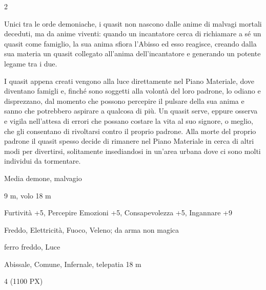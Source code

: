 \begin{multicols}{2}
{Unici tra le orde demoniache, i quasit non nascono dalle anime di malvagi mortali deceduti, ma da anime viventi: quando un incantatore cerca di richiamare a sé un quasit come famiglio, la sua anima sfiora l'Abisso ed esso reagisce, creando dalla sua materia un quasit collegato all'anima dell'incantatore e generando un potente legame tra i due.

I quasit appena creati vengono alla luce direttamente nel Piano Materiale, dove diventano famigli e, finché sono soggetti alla volontà del loro padrone, lo odiano e disprezzano, dal momento che possono percepire il pulsare della sua anima e sanno che potrebbero aspirare a qualcosa di più. Un quasit serve, eppure osserva e vigila nell'attesa di errori che possano costare la vita al suo signore, o meglio, che gli consentano di rivoltarsi contro il proprio padrone. Alla morte del proprio padrone il quasit spesso decide di rimanere nel Piano Materiale in cerca di altri modi per divertirsi, solitamente insediandosi in un'area urbana dove ci sono molti individui da tormentare.

\begin{description}[noitemsep, topsep=0pt, parsep=0pt, partopsep=0pt, itemsep=1pt, leftmargin=2.35cm,  labelwidth=2.2cm, itemindent=0cm, listparindent=0pt] %
\setlength{\baselineskip}{10pt}
\item[\textbf{Taglia/Tipo}] Media demone, malvagio
\item[\textbf{Caratt.}] 
\item[\textbf{Punti Ferita}] 
\item[\textbf{Movimento}] 9 m, volo 18 m
\item[\textbf{Tiri Salvez.}] 
\item[\textbf{Comp.}] Furtività +5, Percepire Emozioni +5, Consapevolezza +5, Ingannare +9
\item[\textbf{Res. Danni}] Freddo, Elettricità, Fuoco, Veleno; da arma non magica
\item[\textbf{Sensi}] 
\item[\textbf{Vulnerabilità}] ferro freddo, Luce
\item[\textbf{Linguaggi}] Abissale, Comune, Infernale, telepatia 18 m
\item[\textbf{Sfida}] 4 (1100 PX)
\end{description}

}
\end{multicols}
